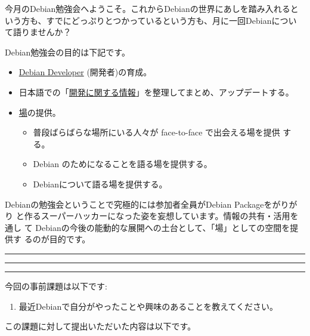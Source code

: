 \documentclass[mingoth,a4paper]{jsarticle}
\begin{document}
\begin{multicols}{2}
 

 今月のDebian勉強会へようこそ。これからDebianの世界にあしを踏み入れると
 いう方も、すでにどっぷりとつかっているという方も、月に一回Debianについ
 て語りませんか？

 Debian勉強会の目的は下記です。

 \begin{itemize}
 \item \underline{Debian Developer} (開発者)の育成。
 \item 日本語での「\underline{開発に関する情報}」を整理してまとめ、アップデートする。
 \item \underline{場}の提供。
 \begin{itemize}
  \item 普段ばらばらな場所にいる人々が face-to-face で出会える場を提供
	する。
  \item Debian のためになることを語る場を提供する。
  \item Debianについて語る場を提供する。
 \end{itemize}
 \end{itemize}		

 Debianの勉強会ということで究極的には参加者全員がDebian Packageをがりがり
 と作るスーパーハッカーになった姿を妄想しています。情報の共有・活用を通し
 て Debianの今後の能動的な展開への土台として、「場」としての空間を提供す
 るのが目的です。

\end{multicols}

\newpage

\begin{minipage}[b]{0.2\hsize}
 \colorbox{titleback}{}
\end{minipage}
\begin{minipage}[b]{0.8\hsize}
\hrule
\vspace{2mm}
\hrule
\begin{multicols}{2}
\tableofcontents
\end{multicols}
\vspace{2mm}
\hrule
\end{minipage}


今回の事前課題は以下です:
\begin{enumerate}
 \item 最近Debianで自分がやったことや興味のあることを教えてください。
\end{enumerate}
この課題に対して提出いただいた内容は以下です。
\begin{multicols}{2}
{\small
 
}
\end{multicols}
\end{document}
